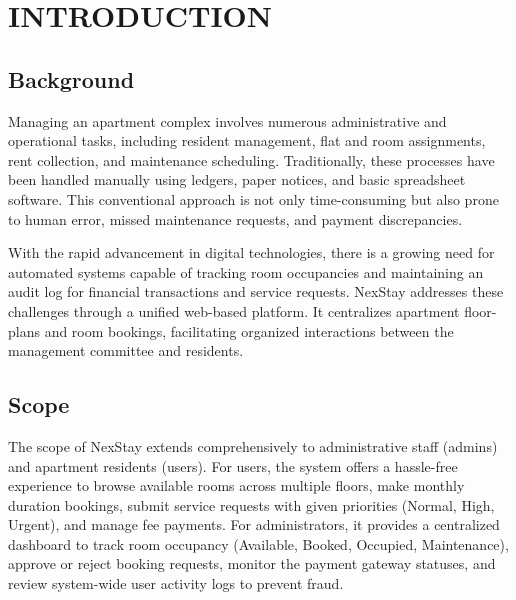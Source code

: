 \documentclass[12pt,a4paper]{report}
\begin{document}
\clearpage

\tableofcontents
\clearpage

\listoffigures
{}
\clearpage


\chapter{INTRODUCTION}

\section{Background}
Managing an apartment complex involves numerous administrative and operational tasks, including resident management, flat and room assignments, rent collection, and maintenance scheduling. Traditionally, these processes have been handled manually using ledgers, paper notices, and basic spreadsheet software. This conventional approach is not only time-consuming but also prone to human error, missed maintenance requests, and payment discrepancies. 

With the rapid advancement in digital technologies, there is a growing need for automated systems capable of tracking room occupancies and maintaining an audit log for financial transactions and service requests. NexStay addresses these challenges through a unified web-based platform. It centralizes apartment floor-plans and room bookings, facilitating organized interactions between the management committee and residents.

\section{Scope}
The scope of NexStay extends comprehensively to administrative staff (admins) and apartment residents (users). For users, the system offers a hassle-free experience to browse available rooms across multiple floors, make monthly duration bookings, submit service requests with given priorities (Normal, High, Urgent), and manage fee payments. For administrators, it provides a centralized dashboard to track room occupancy (Available, Booked, Occupied, Maintenance), approve or reject booking requests, monitor the payment gateway statuses, and review system-wide user activity logs to prevent fraud. 
\end{document}
